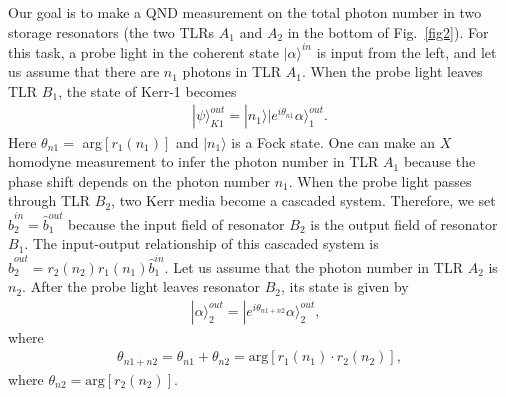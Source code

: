 \documentclass[showpacs,aps,graphicx,twocolumn]{revtex4}
\begin{document}
Our goal is to make a QND measurement on the total photon number in
two storage resonators (the two TLRs $A_1$ and $A_2$ in the bottom
of Fig.~\ref{fig2}). For this task, a probe light in the coherent
state
$|\alpha\rangle^{in}$
is input from the left, and let us assume that there are $n_{1}$
photons in TLR $A_{1}$. When the probe light leaves TLR $B_{1}$, the
state of Kerr-1 becomes
\begin{eqnarray}        \label{eq5}
|\psi\rangle^{out}_{K1}=|n_{1}\rangle |e^{i\theta_{n1}}\alpha\rangle_{1}^{out}.
\end{eqnarray}
Here $\theta_{n1}= $ arg$\left[r_{1}(n_{1})\right]$ and
$|n_{1}\rangle$ is a Fock state.
One can make an $X$ homodyne measurement to infer the photon number
in TLR $A_{1}$ because the phase shift depends on the photon number
$n_{1}$. When the probe light passes through TLR $B_{2}$, two Kerr
media become a cascaded system. Therefore, we set
$\hat{b}^{in}_{2}=\hat{b}^{out}_{1}$ because the input field of resonator
$B_{2}$ is the output field of resonator $B_{1}$. The input-output
relationship of this cascaded system is
$\hat{b}^{out}_{2}=r_{2}(n_{2}) r_{1}(n_{1})\hat{b}^{in}_{1}$.
Let us assume that the photon number in TLR $A_{2}$ is $n_{2}$.
After the probe light leaves resonator $B_{2}$, its state is given
by
\begin{eqnarray}        \label{eq6}
|\alpha\rangle_{2}^{out}\!=\!|e^{i\theta_{n1+n2}}\alpha\rangle_{2}^{out},\;\;
\end{eqnarray}
where
\begin{eqnarray}        \label{eq7}
\theta_{n1+n2}=\theta_{n1}+\theta_{n2}=\text{arg}\left[r_{1}(n_{1})
\cdot r_{2}(n_{2})\right],
\end{eqnarray}
where $\theta_{n2}=\text{arg}\left[r_{2}(n_{2})\right]$.
\end{document}
